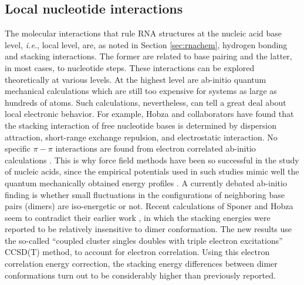 \subsection{Local nucleotide interactions}
\label{sec:local}
The  molecular interactions that  rule RNA  structures at  the nucleic
acid base level, \textit{i.e.}, local  level, are, as noted in Section
\ref{sec:rnachem},  hydrogen bonding  and  stacking interactions.  The
former are related  to base pairing and the latter,  in most cases, to
nucleotide steps. These interactions  can be explored theoretically at
various levels. At the  highest level are ab-initio quantum mechanical
calculations which  are still  too expensive for  systems as  large as
hundreds of atoms.  Such  calculations, nevertheless, can tell a great
deal  about  local  electronic   behavior.   For  example,  Hobza  and
collaborators  have  found  that  the  stacking  interaction  of  free
nucleotide bases  is determined by  dispersion attraction, short-range
exchange  repulsion,  and   electrostatic  interaction.   No  specific
$\pi-\pi$  interactions are found  from electron  correlated ab-initio
calculations \cite{sponer1996,  sponer1997}.  This is  why force field
methods have been  so successful in the study  of nucleic acids, since
the empirical potentials  used in such studies mimic  well the quantum
mechanically obtained energy profiles \cite{tung2004, sponer2000}.
A currently debated ab-initio finding is whether small fluctuations in
the   configurations   of   neighboring   base  pairs   (dimers)   are
iso-energetic  or  not.   Recent  calculations  of  Sponer  and  Hobza
\cite{sponer2006}    seem   to    contradict   their    earlier   work
\cite{sponer2000,  hobza2002},  in which  the  stacking energies  were
reported to  be relatively insensitive to dimer  conformation. The new
results  use  the so-called  ``coupled  cluster  singles doubles  with
triple electron excitations'' CCSD(T)  method, to account for electron
correlation.  Using  this electron correlation  energy correction, the
stacking energy differences between dimer conformations turn out to be
considerably higher than previously reported.

